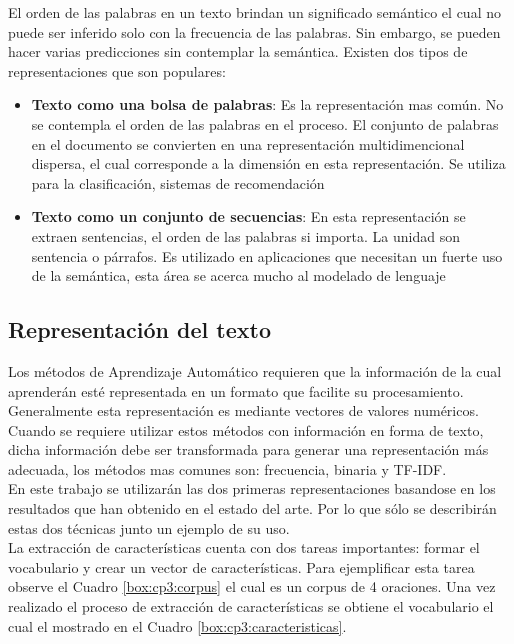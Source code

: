 El orden de las palabras en un texto brindan un significado semántico el cual no puede ser inferido  solo con la frecuencia de las palabras. Sin embargo, se pueden hacer varias predicciones sin contemplar la semántica. Existen dos tipos de representaciones que son populares:

\begin{itemize}
	\item \textbf{Texto como una bolsa de palabras}: Es la representación mas común. No se contempla el orden de las palabras en el proceso. El conjunto de palabras en el documento se convierten en una representación multidimencional dispersa, el cual corresponde a la dimensión en esta representación. Se utiliza para la clasificación, sistemas de recomendación

	\item \textbf{Texto como un conjunto de secuencias}: En esta representación se extraen sentencias, el orden de las palabras si importa. La unidad son sentencia o párrafos. Es utilizado en aplicaciones que necesitan un fuerte uso de la semántica, esta área se acerca mucho al modelado de lenguaje
\end{itemize}


\subsection[Representación del T]{Representación del texto}

Los métodos de Aprendizaje Automático requieren que la información de la cual aprenderán esté representada en un
formato que facilite su procesamiento. Generalmente esta representación es mediante vectores de valores numéricos. 
Cuando se requiere utilizar estos métodos con información en forma de texto, dicha
información debe ser transformada para generar una representación más adecuada, los métodos mas comunes son: frecuencia, binaria y TF-IDF.\\ 


En este trabajo se utilizarán las dos primeras representaciones basandose en los resultados que han obtenido en el estado del arte. Por lo que sólo se describirán estas dos técnicas junto un ejemplo de su uso.\\


La extracción de características cuenta con dos tareas importantes: formar el vocabulario y crear un vector de características. Para ejemplificar esta tarea observe el Cuadro \ref{box:cp3:corpus} el cual es un corpus de 4 oraciones. Una vez realizado el proceso de extracción de características se obtiene el vocabulario el cual el mostrado en el Cuadro \ref{box:cp3:caracteristicas}.\\\\

